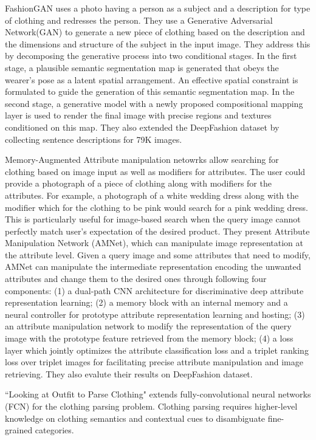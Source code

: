  FashionGAN\cite{cui2018fashiongan} uses a photo having a person as a subject and a description for type of clothing and redresses the person. They use a Generative Adversarial Network(GAN)\cite{goodfellow2014generative} to generate a new piece of clothing based on the description and the dimensions and structure of the subject in the input image. They address this by decomposing the generative process into two conditional stages. In the first stage, a plausible semantic segmentation map  is generated that obeys
the wearer’s pose as a latent spatial arrangement. An effective spatial constraint is formulated to guide the generation
of this semantic segmentation map. In the second stage,
a generative model with a newly proposed compositional
mapping layer is used to render the final image with precise
regions and textures conditioned on this map. They also extended
the DeepFashion dataset by collecting sentence descriptions for 79K images.

Memory-Augmented Attribute manipulation netowrks\cite{zhao2017memory} allow searching for clothing based on image input as well as modifiers for attributes. The user could provide a  photograph of a piece of clothing along with modifiers for the attributes. For example, a photograph of a white wedding dress along with the modifier which for the clothing to be pink would search for a pink wedding dress. This is particularly useful for image-based search when the query image cannot perfectly match user’s expectation of the desired product. They present Attribute Manipulation Network (AMNet), which can manipulate image representation at the attribute level.
Given a query image and some attributes that need to modify, AMNet can manipulate the intermediate representation encoding the unwanted attributes and change them to the
desired ones through following four components: 
(1) a dual-path CNN architecture for discriminative deep attribute representation learning; (2) a memory block with an internal memory and a neural controller for prototype attribute representation learning and hosting; (3) an attribute manipulation network to modify the representation of the query image with the prototype feature retrieved from the
memory block; (4) a loss layer which jointly optimizes the attribute classification loss and a triplet ranking loss over triplet images for facilitating precise attribute manipulation and image retrieving. They also evalute their results on DeepFashion dataset.

``Looking at Outfit to Parse Clothing"\cite{tangseng2017looking} extends fully-convolutional neural networks
(FCN)\cite{long2015fully} for the clothing parsing problem. Clothing parsing requires higher-level knowledge on clothing semantics and contextual cues to disambiguate fine-grained categories.

